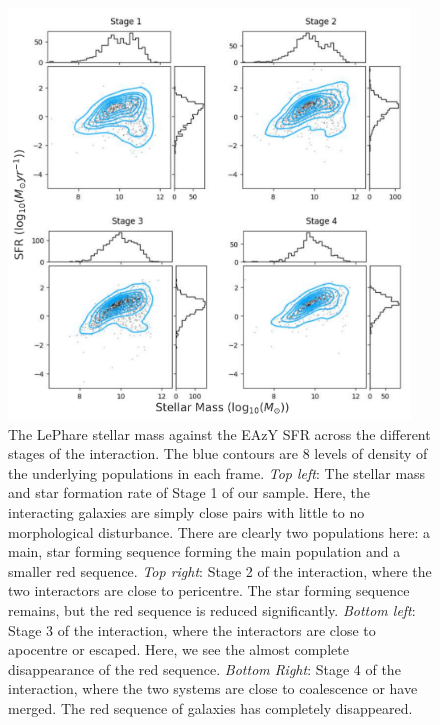 \begin{figure}
    \centering
    \includegraphics[width = 0.95\textwidth]{Chapter3/figures/sfr-mass-stages.pdf}
    \caption{The LePhare stellar mass against the EAzY SFR across the different stages of the interaction. The blue contours are 8 levels of density of the underlying populations in each frame. \textit{Top left}: The stellar mass and star formation rate of Stage 1 of our sample. Here, the interacting galaxies are simply close pairs with little to no morphological disturbance. There are clearly two populations here: a main, star forming sequence forming the main population and a smaller red sequence. \textit{Top right}: Stage 2 of the interaction, where the two interactors are close to pericentre. The star forming sequence remains, but the red sequence is reduced significantly. \textit{Bottom left}: Stage 3 of the interaction, where the interactors are close to apocentre or escaped. Here, we see the almost complete disappearance of the red sequence. \textit{Bottom Right}: Stage 4 of the interaction, where the two systems are close to coalescence or have merged. The red sequence of galaxies has completely disappeared.}
    \label{fig:sfr-mass}
\end{figure}

